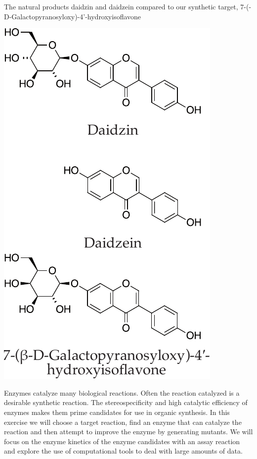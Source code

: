 \documentclass[]{tufte-handout}
\begin{document}
\begin{marginfigure}[5mm]

  \caption[0mm]{The natural products daidzin and daidzein compared to our synthetic target, 7-(\textbeta -D-Galactopyranosyloxy)-4'-hydroxyisoflavone} 
  \vspace{2mm}
    \centering
  \includegraphics[scale=0.6]{Daidzin2.pdf}
  \vspace{5mm}
  \label{fig:fig1}
\end{marginfigure}




Enzymes catalyze many biological reactions. Often the reaction catalyzed is a desirable synthetic reaction. The stereospecificity and high catalytic efficiency of enzymes makes them prime candidates for use in organic synth\-es\-is. In this exercise we will choose a target reaction, find an enzyme that can catalyze the reaction and then attempt to improve the enzyme by generating mutants. We will focus on the enzyme kinetics of the enzyme candidates with an assay reaction and explore the use of computational tools to deal with large amounts of data.
\end{document}
